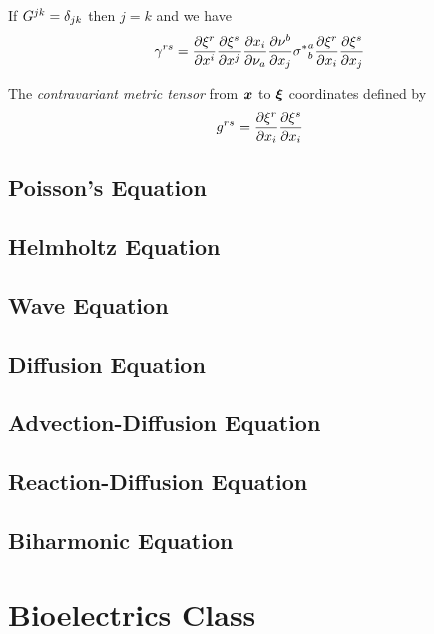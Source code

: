 If $G^{jk}=\delta_{{j}{k}}$ then $j=k$ and we have
\begin{equation}
  \gamma^{rs}= \dfrac{\partial \xi^{r}}{\partial x^{i}}  \dfrac{\partial \xi^{s}}{\partial x^{j}}  \dfrac{\partial x_{i}}{\partial \nu_{a}}  \dfrac{\partial \nu^{b}}{\partial x_{j}} {\sigma^{*}}^{a}_{b} \dfrac{\partial \xi^{r}}{\partial x_{i}}  \dfrac{\partial \xi^{s}}{\partial x_{j}} 
\end{equation}



The \emph{contravariant metric tensor} from $\vect{x}$ to $\vect{\xi}$ coordinates defined by
\begin{equation}
  g^{rs}= \dfrac{\partial \xi^{r}}{\partial x_{i}}  \dfrac{\partial \xi^{s}}{\partial x_{i}} 
  \label{eqn:contrametrictensor}
\end{equation}


\subsection{Poisson's Equation}

\subsection{Helmholtz Equation}

\subsection{Wave Equation}

\subsection{Diffusion Equation}

\subsection{Advection-Diffusion Equation}

\subsection{Reaction-Diffusion Equation}

\subsection{Biharmonic Equation}

\section{Bioelectrics Class}

